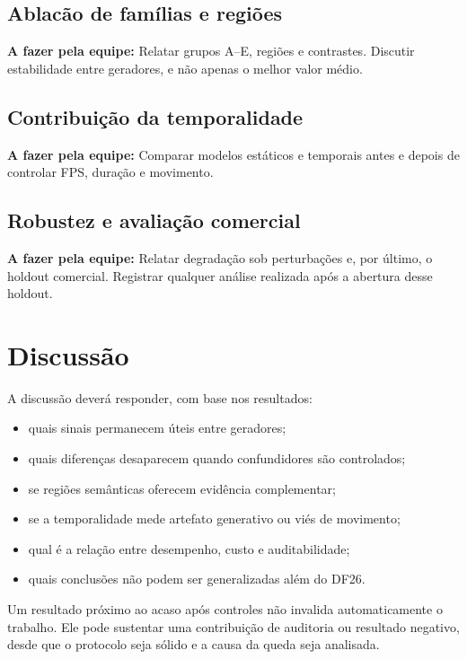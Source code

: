 \documentclass[11pt,a4paper]{article}
\newcommand{\afazer}[1]{%
  \par\smallskip
  \noindent\textcolor{red!70!black}{\textbf{A fazer pela equipe:} #1}
  \par\smallskip
}
\begin{document}
\subsection{Ablacão de famílias e regiões}

\afazer{Relatar grupos A--E, regiões e contrastes. Discutir estabilidade entre
geradores, e não apenas o melhor valor médio.}

\subsection{Contribuição da temporalidade}

\afazer{Comparar modelos estáticos e temporais antes e depois de controlar FPS,
duração e movimento.}

\subsection{Robustez e avaliação comercial}

\afazer{Relatar degradação sob perturbações e, por último, o holdout comercial.
Registrar qualquer análise realizada após a abertura desse holdout.}

\section{Discussão}

A discussão deverá responder, com base nos resultados:

\begin{itemize}
  \item quais sinais permanecem úteis entre geradores;
  \item quais diferenças desaparecem quando confundidores são controlados;
  \item se regiões semânticas oferecem evidência complementar;
  \item se a temporalidade mede artefato generativo ou viés de movimento;
  \item qual é a relação entre desempenho, custo e auditabilidade;
  \item quais conclusões não podem ser generalizadas além do DF26.
\end{itemize}

Um resultado próximo ao acaso após controles não invalida automaticamente o
trabalho. Ele pode sustentar uma contribuição de auditoria ou resultado
negativo, desde que o protocolo seja sólido e a causa da queda seja analisada.
\end{document}
